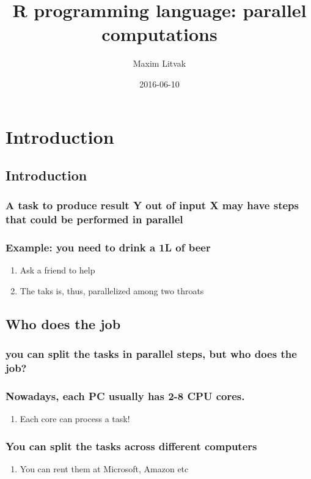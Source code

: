 \documentclass[bigger]{beamer}
\author{Maxim Litvak}
\date{2016-06-10}
\title{R programming language: parallel computations}
\begin{document}
\maketitle
\tableofcontents

\section{Introduction}
\label{sec-1}
\subsection{Introduction}
\label{sec-1-1}
\subsubsection{A task to produce result Y out of input X may have steps that could be performed in parallel}
\label{sec-1-1-1}
\subsubsection{Example: you need to drink a 1L of beer}
\label{sec-1-1-2}
\begin{enumerate}
\item Ask a friend to help
\label{sec-1-1-2-1}
\item The taks is, thus, parallelized among two throats
\label{sec-1-1-2-2}
\end{enumerate}
\subsection{Who does the job}
\label{sec-1-2}
\subsubsection{you can split the tasks in parallel steps, but who does the job?}
\label{sec-1-2-1}
\subsubsection{Nowadays, each PC usually has 2-8 CPU cores.}
\label{sec-1-2-2}
\begin{enumerate}
\item Each core can process a task!
\label{sec-1-2-2-1}
\end{enumerate}
\subsubsection{You can split the tasks across different computers}
\label{sec-1-2-3}
\begin{enumerate}
\item You can rent them at Microsoft, Amazon etc
\label{sec-1-2-3-1}
\end{enumerate}
\end{document}
